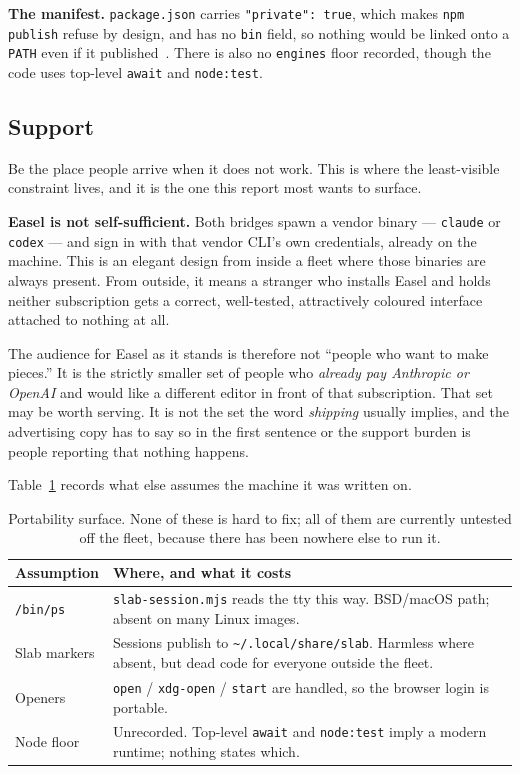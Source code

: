 \documentclass[10pt,letterpaper,twocolumn]{article}
\newcommand{\code}[1]{\texttt{#1}}
\begin{document}
\textbf{The manifest.} \code{package.json} carries \code{"private": true}, which
makes \code{npm publish} refuse by design, and has no \code{bin} field, so
nothing would be linked onto a \code{PATH} even if it published~\citep{npmpublish}.
There is also
no \code{engines} floor recorded, though the code uses top-level \code{await}
and \code{node:test}.

\subsection{Support}

Be the place people arrive when it does not work. This is where the
least-visible constraint lives, and it is the one this report most wants to
surface.

\textbf{Easel is not self-sufficient.} Both bridges spawn a vendor binary ---
\code{claude} or \code{codex} --- and sign in with that vendor CLI's own
credentials, already on the machine. This is an elegant design from inside a
fleet where those binaries are always present. From outside, it means a stranger
who installs Easel and holds neither subscription gets a correct, well-tested,
attractively coloured interface attached to nothing at all.

The audience for Easel as it stands is therefore not ``people who want to make
pieces.'' It is the strictly smaller set of people who \emph{already pay
Anthropic or OpenAI} and would like a different editor in front of that
subscription. That set may be worth serving. It is not the set the word
\emph{shipping} usually implies, and the advertising copy has to say so in the
first sentence or the support burden is people reporting that nothing happens.

Table~\ref{tab:portability} records what else assumes the machine it was written
on.

\begin{table}[t]
\centering
\footnotesize
\begin{tabularx}{\columnwidth}{@{}lX@{}}
\toprule
\textbf{Assumption} & \textbf{Where, and what it costs} \\
\midrule
\code{/bin/ps} & \code{slab-session.mjs} reads the tty this way. BSD/macOS path; absent on many Linux images. \\
Slab markers & Sessions publish to \code{\~{}/.local/share/slab}. Harmless where absent, but dead code for everyone outside the fleet. \\
Openers & \code{open} / \code{xdg-open} / \code{start} are handled, so the browser login is portable. \\
Node floor & Unrecorded. Top-level \code{await} and \code{node:test} imply a modern runtime; nothing states which. \\
\bottomrule
\end{tabularx}
\caption{Portability surface. None of these is hard to fix; all of them are
currently untested off the fleet, because there has been nowhere else to run it.}
\label{tab:portability}
\end{table}
\end{document}
